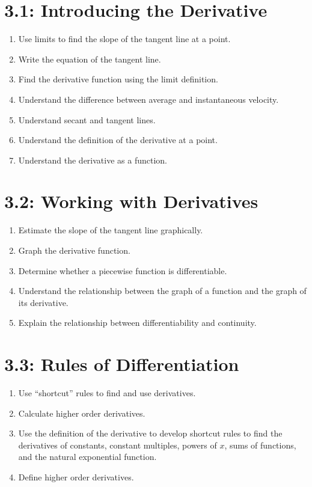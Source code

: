 \documentclass[11pt]{article}
\begin{document}
\section*{3.1: Introducing the Derivative}
\begin{enumerate}
	\item Use limits to find the slope of the tangent line at a point.
	\item Write the equation of the tangent line.
	\item Find the derivative function using the limit definition.
	\item Understand the difference between average and instantaneous velocity.
	\item Understand secant and tangent lines.
	\item Understand the definition of the derivative at a point.
	\item Understand the derivative as a function.
\end{enumerate}

\section*{3.2: Working with Derivatives}
\begin{enumerate}
	\item Estimate the slope of the tangent line graphically.
	\item Graph the derivative function.
	\item Determine whether a piecewise function is differentiable.
	\item Understand the relationship between the graph of a function and the graph of its derivative.
	\item Explain the relationship between differentiability and continuity.
\end{enumerate}

\section*{3.3: Rules of Differentiation}
\begin{enumerate}
	\item Use ``shortcut'' rules to find and use derivatives.
	\item Calculate higher order derivatives.
	\item Use the definition of the derivative to develop shortcut rules to find the derivatives of constants, constant multiples, powers of $x$, sums of functions, and the natural exponential function.
	\item Define higher order derivatives.
\end{enumerate}
\end{document}
